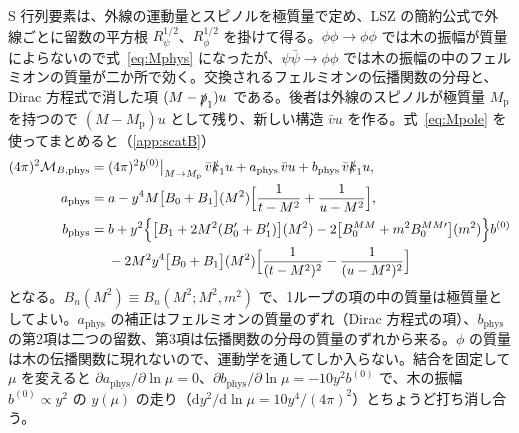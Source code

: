 \documentclass[a4paper,10pt]{ltjsarticle}
\newcommand{\dd}{\mathrm{d}}
\begin{document}
S 行列要素は、外線の運動量とスピノルを極質量で定め、LSZ の簡約公式で外線ごとに留数の平方根 $R_\psi^{1/2}$、$R_\phi^{1/2}$ を掛けて得る。$\phi\phi\to\phi\phi$ では木の振幅が質量によらないので式~\eqref{eq:Mphys} になったが、$\psi\bar\psi\to\phi\phi$ では木の振幅の中のフェルミオンの質量が二か所で効く。交換されるフェルミオンの伝播関数の分母と、Dirac 方程式で消した項 $(M-\slashed p_1)u$ である。後者は外線のスピノルが極質量 $M_{\mathrm p}$ を持つので $(M-M_{\mathrm p})u$ として残り、新しい構造 $\bar vu$ を作る。式~\eqref{eq:Mpole} を使ってまとめると（\ref{app:scatB}）
\begin{equation}
\begin{aligned}
(4\pi)^2\mathcal M_{B,\mathrm{phys}}={}&(4\pi)^2b^{(0)}\big|_{M\to M_{\mathrm p}}\,\bar v\slashed k_1u+a_{\mathrm{phys}}\,\bar vu+b_{\mathrm{phys}}\,\bar v\slashed k_1u,\\
a_{\mathrm{phys}}={}&a-y^4M\bigl[B_0+B_1\bigr](M^2)\Bigl[\frac{1}{t-M^2}+\frac{1}{u-M^2}\Bigr],\\
b_{\mathrm{phys}}={}&b+y^2\Bigl\{\bigl[B_1+2M^2(B_0'+B_1')\bigr](M^2)-2\bigl[B_0^{MM}+m^2B_0^{MM\prime}\bigr](m^2)\Bigr\}b^{(0)}\\
&-2M^2y^4\bigl[B_0+B_1\bigr](M^2)\Bigl[\frac{1}{(t-M^2)^2}-\frac{1}{(u-M^2)^2}\Bigr]
\end{aligned}
\label{eq:MphysB}
\end{equation}
となる。$B_n(M^2)\equiv B_n(M^2;M^2,m^2)$ で、1ループの項の中の質量は極質量としてよい。$a_{\mathrm{phys}}$ の補正はフェルミオンの質量のずれ（Dirac 方程式の項）、$b_{\mathrm{phys}}$ の第2項は二つの留数、第3項は伝播関数の分母の質量のずれから来る。$\phi$ の質量は木の伝播関数に現れないので、運動学を通してしか入らない。結合を固定して $\mu$ を変えると $\partial a_{\mathrm{phys}}/\partial\ln\mu=0$、$\partial b_{\mathrm{phys}}/\partial\ln\mu=-10y^2b^{(0)}$ で、木の振幅 $b^{(0)}\propto y^2$ の $y(\mu)$ の走り（$\dd y^2/\dd\ln\mu=10y^4/(4\pi)^2$）とちょうど打ち消し合う。
\end{document}
